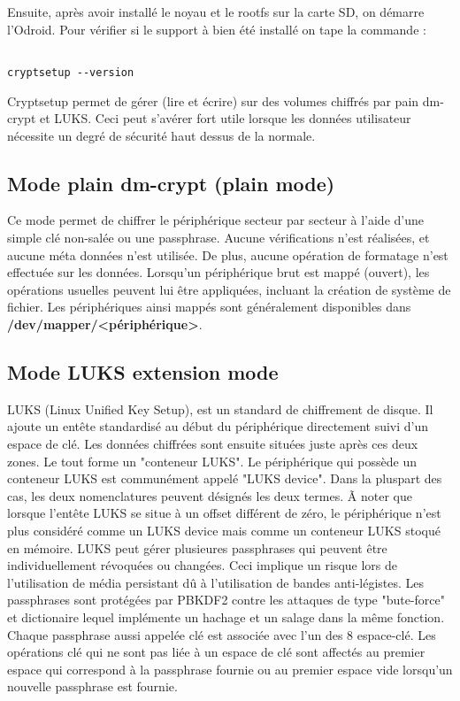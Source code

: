 Ensuite, après avoir installé le noyau et le rootfs sur la carte SD, on démarre l'Odroid. Pour vérifier si le support à bien été installé on tape la commande : 
\begin{lstlisting}[frame=single,style=Console]  % Start your code-block

cryptsetup --version
\end{lstlisting}

Cryptsetup permet de gérer (lire et écrire) sur des volumes chiffrés par pain dm-crypt et LUKS. Ceci peut s'avérer fort utile lorsque les données utilisateur nécessite un degré de sécurité haut dessus de la normale.
\subsection{Mode plain dm-crypt (plain mode)}
Ce mode permet de chiffrer le périphérique secteur par secteur à l'aide d'une simple clé non-salée ou une passphrase. Aucune vérifications n'est réalisées, et aucune méta données n'est utilisée. De plus, aucune opération de formatage n'est effectuée sur les données. Lorsqu'un périphérique brut est mappé (ouvert), les opérations usuelles peuvent lui être appliquées, incluant la création de système de fichier. Les périphériques ainsi mappés sont généralement disponibles dans \textbf{/dev/mapper/<périphérique>}.
\subsection{Mode LUKS extension mode}
LUKS (Linux Unified Key Setup), est un standard de chiffrement de disque. Il ajoute un entête standardisé au début du périphérique directement suivi d'un espace de clé. Les données chiffrées sont ensuite situées juste après ces deux zones. Le tout forme un "conteneur LUKS". Le périphérique qui possède un conteneur LUKS est communément appelé "LUKS device". Dans la pluspart des cas, les deux nomenclatures peuvent désignés les deux termes. Ã noter que lorsque l'entête LUKS se situe à un offset différent de zéro, le périphérique n'est plus considéré comme un LUKS device mais comme un conteneur LUKS stoqué en mémoire. LUKS peut gérer plusieures passphrases qui peuvent être individuellement révoquées ou changées. Ceci implique un risque lors de l'utilisation de média persistant dû à l'utilisation de  bandes anti-légistes. Les passphrases sont protégées par PBKDF2 contre les attaques de type "bute-force" et dictionaire lequel implémente un hachage et un salage dans la même fonction. Chaque passphrase aussi appelée clé est associée avec l'un des 8 espace-clé. Les opérations clé qui ne sont pas liée à un espace de clé sont affectés au premier espace qui correspond à la passphrase fournie ou au premier espace vide lorsqu'un nouvelle passphrase est fournie.

